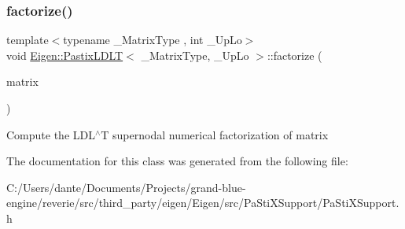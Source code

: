\subsubsection{\texorpdfstring{factorize()}{factorize()}}
{\footnotesize\ttfamily template$<$typename \+\_\+\+Matrix\+Type , int \+\_\+\+Up\+Lo$>$ \\
void \mbox{\hyperlink{class_eigen_1_1_pastix_l_d_l_t}{Eigen\+::\+Pastix\+L\+D\+LT}}$<$ \+\_\+\+Matrix\+Type, \+\_\+\+Up\+Lo $>$\+::factorize (\begin{DoxyParamCaption}\item[{const Matrix\+Type \&}]{matrix }\end{DoxyParamCaption})\hspace{0.3cm}{\ttfamily [inline]}}

Compute the L\+D\+L$^\wedge$T supernodal numerical factorization of {\ttfamily matrix} 

The documentation for this class was generated from the following file\+:\begin{DoxyCompactItemize}
\item 
C\+:/\+Users/dante/\+Documents/\+Projects/grand-\/blue-\/engine/reverie/src/third\+\_\+party/eigen/\+Eigen/src/\+Pa\+Sti\+X\+Support/Pa\+Sti\+X\+Support.\+h\end{DoxyCompactItemize}
